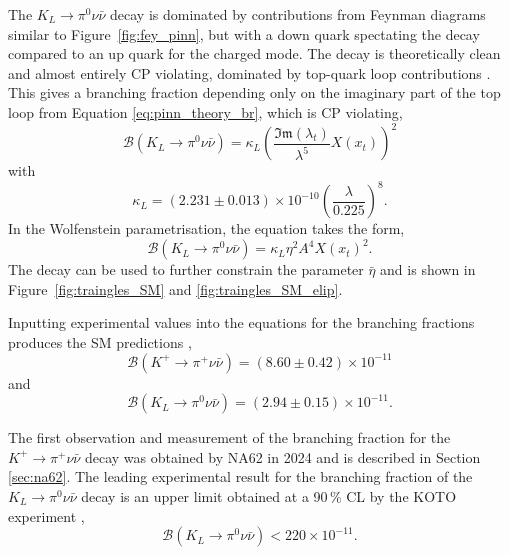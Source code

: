 \documentclass[../main.tex]{subfiles}
\begin{document}
    The $K_L \to \pi^0 \nu \bar{\nu}$ decay is dominated by contributions from Feynman diagrams similar to Figure~\ref{fig:fey_pinn}, but with a down quark spectating the decay compared to an up quark for the charged mode. The decay is theoretically clean and almost entirely \gls{CP} violating, dominated by top-quark loop contributions \cite{PhysRevD.39.3322}. This gives a branching fraction depending only on the imaginary part of the top loop from Equation \ref{eq:pinn_theory_br}, which is \gls{CP} violating,
    \begin{equation}
        \mathcal{B}(K_L \to \pi^0 \nu \bar{\nu}) = \kappa_L \left(\frac{\mathfrak{Im}(\lambda_t)}{\lambda^5} X(x_t) \right)^2
    \end{equation}
    with
    \begin{equation}
        \kappa_L = (2.231 \pm 0.013) \times 10^{-10} \left(\frac{\lambda}{0.225}\right)^8.
    \end{equation}
    In the Wolfenstein parametrisation, the equation takes the form, 
    \begin{equation}
        \mathcal{B}(K_L \to \pi^0 \nu \bar{\nu}) = \kappa_L \eta^2 A^4 X(x_t)^2.
    \end{equation}
    The decay can be used to further constrain the parameter $\bar{\eta}$ and is shown in Figure~\ref{fig:traingles_SM} and \ref{fig:traingles_SM_elip}.
    
    
    Inputting experimental values into the equations for the branching fractions produces the \gls{SM} predictions \cite{Buras2022},
    \begin{equation}\label{eq:PNN_theory_val}
        \mathcal{B}(K^+ \to \pi^+ \nu \bar{\nu}) = (8.60 \pm 0.42) \times 10^{-11}
    \end{equation}
    and 
    \begin{equation}
        \mathcal{B}(K_L \to \pi^0 \nu \bar{\nu}) = (2.94 \pm 0.15) \times 10^{-11}.
    \end{equation}

    The first observation and measurement of the branching fraction for the $K^+ \to \pi^+ \nu \bar{\nu}$ decay was obtained by NA62 in 2024 and is described in Section \ref{sec:na62}. The leading experimental result for the branching fraction of the $K_L \to \pi^0 \nu \bar{\nu}$ decay is an upper limit obtained at a 90\,\% \gls{CL} by the 
    KOTO experiment \cite{PhysRevLett.134.081802}, 
    \begin{equation}
        \mathcal{B}(K_L \to \pi^0 \nu \bar{\nu}) < 220 \times 10^{-11}.
    \end{equation}
\end{document}
